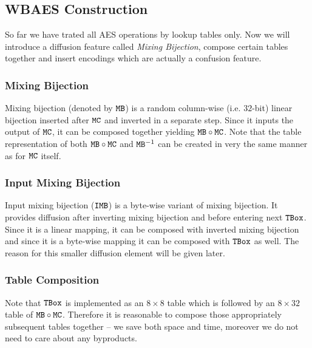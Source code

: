 
\subsection{WBAES Construction}

So far we have trated all AES operations by lookup tables only. Now we will introduce a diffusion feature called {\em Mixing Bijection}, compose certain tables together and insert encodings which are actually a confusion feature.

\subsubsection{Mixing Bijection}
	
	Mixing bijection (denoted by $\texttt{MB}$) is a random column-wise (i.e. $32$-bit) linear bijection inserted after $\texttt{MC}$ and inverted in a separate step. Since it inputs the output of $\texttt{MC}$, it can be composed together yielding $\texttt{MB}\circ\texttt{MC}$. Note that the table representation of both $\texttt{MB}\circ\texttt{MC}$ and $\texttt{MB}^{-1}$ can be created in very the same manner as for $\texttt{MC}$ itself.
	

\subsubsection{Input Mixing Bijection}
	
	Input mixing bijection ($\texttt{IMB}$) is a byte-wise variant of mixing bijection. It provides diffusion after inverting mixing bijection and before entering next $\texttt{TBox}$. Since it is a linear mapping, it can be composed with inverted mixing bijection and since it is a byte-wise mapping it can be composed with $\texttt{TBox}$ as well. The reason for this smaller diffusion element will be given later.

\subsubsection{Table Composition}
	
	Note that $\texttt{TBox}$ is implemented as an $8\times 8$ table which is followed by an $8\times 32$ table of $\texttt{MB}\circ\texttt{MC}$. Therefore it is reasonable to compose those appropriately subsequent tables together -- we save both space and time, moreover we do not need to care about any byproducts.

